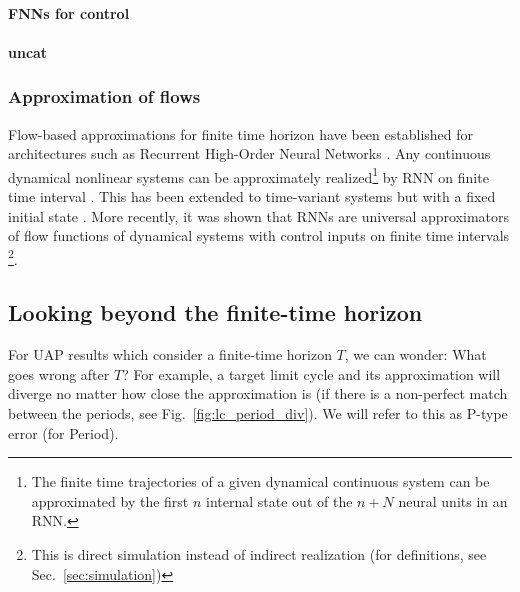 \documentclass{article}
\theoremstyle{definition} \newtheorem{definition}{Definition}
\theoremstyle{remark} \newtheorem{remark}{Remark}
\newcommand{\reals}{\mathbb{R}}
\newcounter{ct}
\begin{document}
\paragraph{FNNs for control}
\citep{psaltis1988multilayered} \citep{li1989control,chen1992adaptive}

\paragraph{uncat}



\subsubsection{Approximation of flows}%
Flow-based approximations for finite time horizon have been established for architectures such as Recurrent High-Order Neural Networks \citep{kosmatopoulos1995structural}.
Any continuous dynamical nonlinear systems can be approximately realized\footnote{The finite time trajectories of a given dynamical continuous system can be approximated by the first $n$ internal state out of the $n + N$ neural units in an RNN.} by RNN on finite time interval \citep{chow2000modeling}.
%
This has been extended to time-variant systems but with a fixed initial state \citep{li2005approximation}. %
%
More recently, it was shown that RNNs are universal approximators of flow functions of dynamical systems  with control inputs on finite time intervals  \citep{aguiar2023universal}\footnote{This is direct simulation instead of indirect realization (for definitions, see Sec.~\ref{sec:simulation})}. %



\subsection{Looking beyond the finite-time horizon}\label{sec:beyondfinitetime}

For UAP results which consider a finite-time horizon $T$, we can wonder: What goes wrong after $T$?
%
For example, a target limit cycle and its approximation will diverge no matter how close the approximation is (if there is a non-perfect match between the periods, see Fig.~\ref{fig:lc_period_div}).
We will refer to this as P-type error (for Period).
\end{document}
